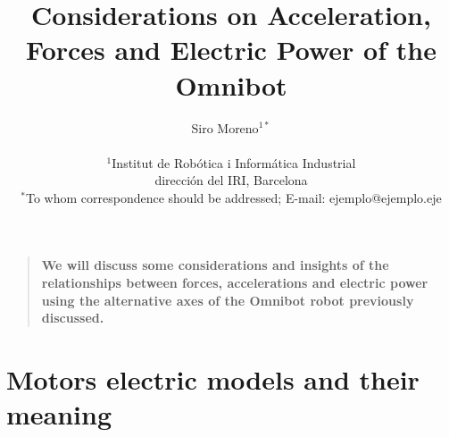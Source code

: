 \documentclass[12pt]{article}
\title{Considerations on Acceleration, Forces and Electric Power of the Omnibot}
\author
{Siro Moreno$^{1\ast}$ \\
\\
\normalsize{$^{1}$Institut de Robótica i Informática Industrial}\\
\normalsize{dirección del IRI, Barcelona}\\
\normalsize{$^\ast$To whom correspondence should be addressed; E-mail:  ejemplo@ejemplo.eje}
}
\date{}
\newenvironment{sciabstract}{%
\begin{quote} \bf}
{\end{quote}}
\begin{document}
 


\baselineskip24pt


\maketitle 




\begin{sciabstract}
  We will discuss some considerations and insights of the relationships between forces, accelerations and electric power using the alternative axes of the Omnibot robot previously discussed.
\end{sciabstract}




\section*{Motors electric models and their meaning}
\end{document}

